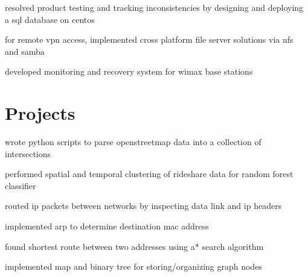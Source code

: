 \begin{minipage}[t]{0.66\textwidth}
\begin{tightitemize}
    \item resolved product testing and tracking inconsistencies by designing and deploying a sql database on centos
    \item for remote vpn access, implemented cross platform file server solutions via nfs and samba
    \item developed monitoring and recovery system for wimax base stations
\end{tightitemize}

\section{Projects}
\descript{}
\begin{tightitemize}
    \item wrote python scripts to parse openstreetmap data into a collection of intersections
    \item performed spatial and temporal clustering of rideshare data for random forest classifier
\end{tightitemize}

\descript{}
\begin{tightitemize}
    \item routed ip packets between networks by inspecting data link and ip headers 
    \item implemented arp to determine destination mac address 
\end{tightitemize}

\descript{}
\begin{tightitemize}
    \item found shortest route between two addresses using a* search algorithm
    \item implemented map and binary tree for storing/organizing graph nodes
\end{tightitemize}



\end{minipage} %
\vspace*{\fill}
